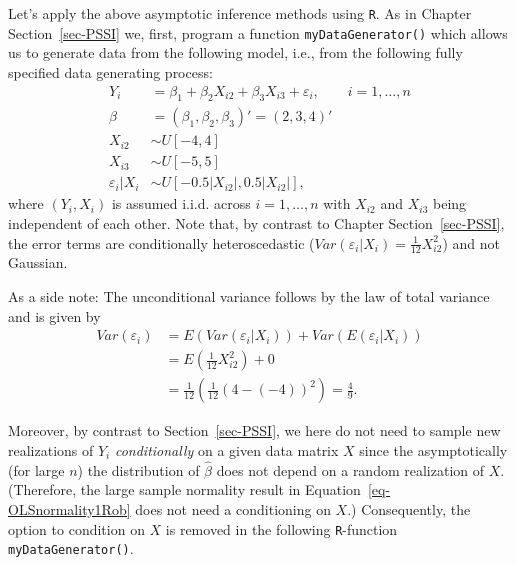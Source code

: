 \documentclass[
  letterpaper,
  DIV=11,
  numbers=noendperiod]{scrreprt}
\theoremstyle{definition}
\theoremstyle{plain}
\theoremstyle{plain}
\theoremstyle{remark}
\begin{document}
{Let's apply the above asymptotic inference methods using \texttt{R}. As
in Chapter Section~\ref{sec-PSSI} we, first, program a function
\texttt{myDataGenerator()} which allows us to generate data from the
following model, i.e., from the following fully specified data
generating process: \begin{align*}
Y_i &=\beta_1+\beta_2X_{i2}+\beta_3X_{i3}+\varepsilon_i,\qquad i=1,\dots,n\\
\beta &=(\beta_1,\beta_2,\beta_3)'=(2,3,4)'\\
X_{i2}&\sim U[-4,4]\\
X_{i3}&\sim U[-5,5]\\
\varepsilon_i|X_i&\sim U[-0.5 |X_{i2}|, 0.5 |X_{i2}|],
\end{align*} where \((Y_i,X_i)\) is assumed i.i.d. across
\(i=1,\dots,n\) with \(X_{i2}\) and \(X_{i3}\) being independent of each
other. Note that, by contrast to Chapter Section~\ref{sec-PSSI}, the
error terms are conditionally heteroscedastic
(\(Var(\varepsilon_i|X_i)=\frac{1}{12}X_{i2}^2\)) and not Gaussian.

As a side note: The unconditional variance follows by the law of total
variance and is given by \begin{align*}
Var(\varepsilon_i)
&=E(Var(\varepsilon_i|X_i))+Var(E(\varepsilon_i|X_i))\\
&=E\left(\frac{1}{12}X_{i2}^2\right)+0\\
&=\frac{1}{12}\left(\frac{1}{12}(4-(-4))^2\right)=\frac{4}{9}.
\end{align*}

Moreover, by contrast to Section~\ref{sec-PSSI}, we here do not need to
sample new realizations of \(Y_i\) \emph{conditionally} on a given data
matrix \(X\) since the asymptotically (for large \(n\)) the distribution
of \(\hat\beta\) does not depend on a random realization of \(X\).
(Therefore, the large sample normality result in
Equation~\ref{eq-OLSnormality1Rob} does not need a conditioning on
\(X\).) Consequently, the option to condition on \(X\) is removed in the
following \texttt{R}-function \texttt{myDataGenerator()}.

}
\end{document}
